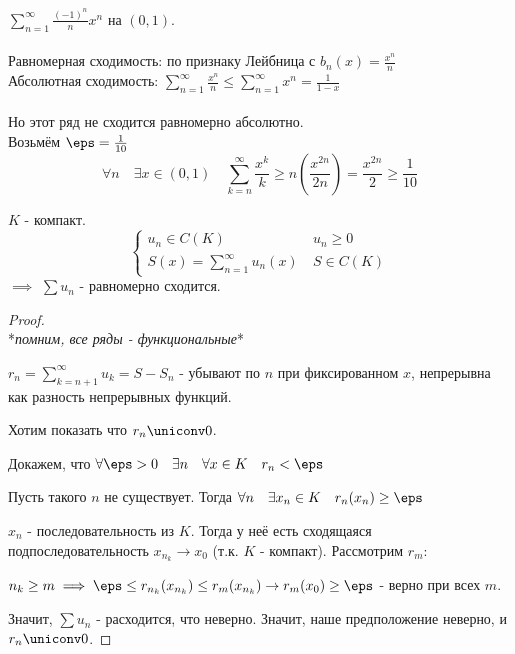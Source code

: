 
\begin{example} \thmslashn

	$\sum^{\infty}_{n = 1} \frac{(-1)^n}{n}x^n$ на $(0, 1)$.\\
	\\
	Равномерная сходимость: по признаку Лейбница с $b_n(x) = \frac{x^n}{n}$\\
	Абсолютная сходимость: $\sum^{\infty}_{n = 1}\frac{x^n}{n} \leq \sum^{\infty}_{n = 1} x^n = \frac{1}{1-x}$\\
	\\
	Но этот ряд не сходится равномерно абсолютно.\\
	Возьмём $\eps = \frac{1}{10}$
	\[ \forall{n} \quad \exists{x \in (0,1)} \quad \sum^{\infty}_{k = n} \frac{x^k}{k} \ge n\left(\frac{x^{2n}}{2n}\right) = \frac{x^{2n}}{2} \ge \frac{1}{10} \]
\end{example}

\begin{statement} \thmslashn
	
	$K$ - компакт.
	\begin{equation*}
		\begin{cases}
			u_n \in C(K) &\ u_n \geq 0 \\
			S(x) = \sum^{\infty}_{n = 1} u_n(x) &\ S \in C(K)
		\end{cases}
	\end{equation*}
	$\implies$ $\sum u_n$ - равномерно сходится.
	\begin{proof} ~\\
		*\textit{помним, все ряды - функциональные}* 

		$r_n = \sum^{\infty}_{k = n+1} u_k = S - S_n$ - убывают по $n$ при фиксированном $x$, непрерывна как разность непрерывных функций.

		Хотим показать что $r_n \uniconv 0$.

    Докажем, что $\forall{\eps > 0} \quad \exists{n}\quad \forall{x \in K} \quad r_n < \eps$

		Пусть такого $n$ не существует. Тогда $\forall{n} \quad \exists{x_n \in K}\quad r_n(x_n) \geq \eps $ 

		$x_n$ - последовательность из $K$. Тогда у неё есть сходящаяся подпоследовательность $x_{n_k}\to x_0$ (т.к. $K$ - компакт). 
		Рассмотрим $r_m$:

		$n_k \geq m \implies \eps \leq r_{n_k}(x_{n_k}) \leq r_m(x_{n_k}) \to r_m(x_0) \geq \eps $ - верно при всех $m$.

		Значит, $\sum u_n$ - расходится, что неверно. Значит, наше предположение неверно, и $r_n \uniconv 0$.
	\end{proof}
\end{statement}
